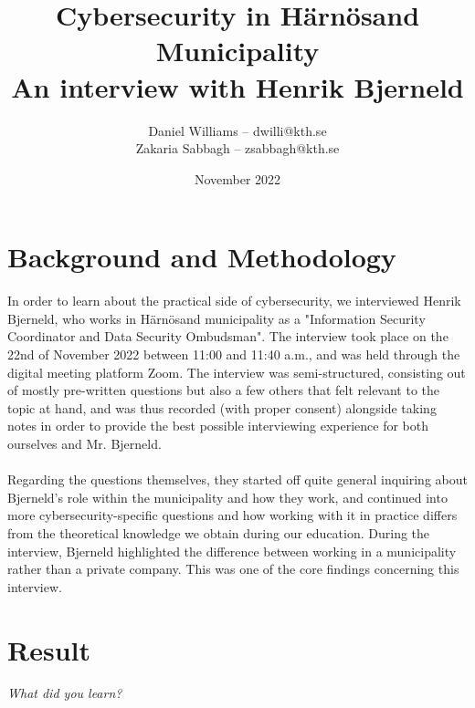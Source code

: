 \documentclass{article}
\begin{document}
\title{\textbf{Cybersecurity in Härnösand Municipality} \\
               An interview with Henrik Bjerneld}
\author{Daniel Williams -- dwilli@kth.se \\
        Zakaria Sabbagh -- zsabbagh@kth.se}
\date{November 2022}

\maketitle
\restoregeometry
\newpage

\section{Background and Methodology}
In order to learn about the practical side of cybersecurity, we interviewed Henrik Bjerneld, who works in Härnösand municipality as a "Information Security Coordinator and Data Security Ombudsman". 
The interview took place on the 22nd of November 2022 between 11:00 and 11:40 a.m., and was held through the digital meeting platform Zoom. The interview was semi-structured, consisting out of mostly pre-written questions but also a few others that felt relevant to the topic at hand, and was thus recorded (with proper consent) alongside taking notes in order to provide the best possible interviewing experience for both ourselves and Mr. Bjerneld.
\\
\\
Regarding the questions themselves, they started off quite general inquiring about Bjerneld's role within the municipality and how they work, and continued into more cybersecurity-specific questions and how working with it in practice differs from the theoretical knowledge we obtain during our education.
During the interview, Bjerneld highlighted the difference between working in a municipality rather than a private company.
This was one of the core findings concerning this interview.

\section{Result}
\textit{What did you learn?}
\end{document}
